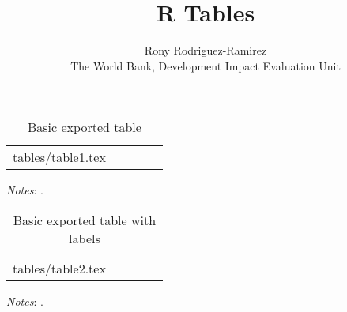 \documentclass[a4paper]{article}
\title{R Tables}
\author{Rony Rodriguez-Ramirez\\{\normalsize The World Bank, Development Impact Evaluation Unit}}
\makeatletter
\newcommand\primitiveinput[1]
{\@@input #1 }
\makeatother
\begin{document}
\maketitle
\listoftables
\newpage
\newpage 


\begin{table}[H]
	\centering
	\label{tab:Table}
	\begin{adjustbox}{max width=\linewidth}
		\begin{threeparttable}
			\caption{Basic exported table}
			\begin{tabular}{@{}l*{4}{c}@{}}
                \toprule
                \toprule 
				\primitiveinput{tables/table1.tex}
				\bottomrule
			\end{tabular}
			\begin{tablenotes}
				\setlength{}
				\footnotesize
				\item \textit{Notes}: \lipsum[1].
			\end{tablenotes}
		\end{threeparttable}
	\end{adjustbox}
\end{table}
\newpage 

\begin{table}[H]
	\centering
	\label{tab:Table2}
	\begin{adjustbox}{max width=\linewidth}
		\begin{threeparttable}
			\caption{Basic exported table with labels}
			\begin{tabular}{@{}l*{4}{c}@{}}
                \toprule
                \toprule 
				\primitiveinput{tables/table2.tex}
				\bottomrule
			\end{tabular}
			\begin{tablenotes}
				\setlength\labelsep{0pt}
				\footnotesize
				\item \textit{Notes}: \lipsum[1].
			\end{tablenotes}
		\end{threeparttable}
	\end{adjustbox}
\end{table}
\newpage 
\end{document}
